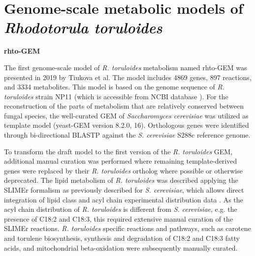 
\section{Genome-scale metabolic models of \textit{Rhodotorula toruloides}} 

\textbf{rhto-GEM}

The first genome-scale model of \textit{R. toruloides} metabolism named rhto-GEM was presented in 2019 by Tiukova et al. The model includes 4869 genes, 897 reactions, and 3334 metabolites. This model is based on the genome sequence of \textit{R. toruloides} strain NP11 \cite{Zhu2012} (which is accessible from NCBI database \cite{NP11genome}). For the reconstruction of the parts of metabolism that are relatively conserved between fungal species, the well-curated GEM of \textit{Saccharomyces cerevisiae} was utilized as template model (yeast-GEM version 8.2.0, 16). Orthologous genes were identified through bi-directional BLASTP against the \textit{S. cerevisiae} S288c reference genome. \cite{Tiukova2019}

To transform the draft model to the first version of the \textit{R. toruloides} GEM, additional manual curation was performed where remaining template-derived genes were replaced by their \textit{R. toruloides} 
ortholog where possible or otherwise deprecated. The lipid metabolism of \textit{R. toruloides} was described applying the SLIMEr formalism as previously described for \textit{S. cerevisiae}, which allows direct integration of lipid class and acyl chain experimental distribution data \cite{Sanchez2019}. As the acyl chain distribution of \textit{R. toruloides} is different from \textit{S. cerevisiae}, e.g. the presence of C18:2 and C18:3, this required extensive manual curation of the SLIMEr reactions. \textit{R. toruloides} specific reactions and pathways, such as carotene and torulene biosynthesis, synthesis and degradation of C18:2 and C18:3 fatty acids, and mitochondrial beta-oxidation were subsequently manually curated. \cite{Tiukova2019}

